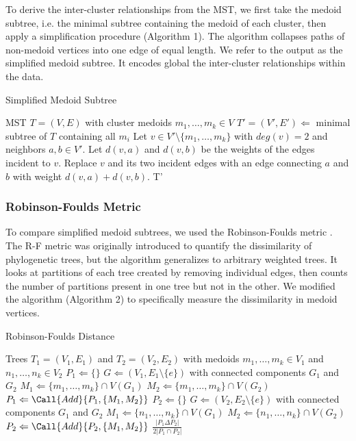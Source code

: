 \documentclass{article}
\begin{document}
{To derive the inter-cluster relationships from the MST, we first take the medoid subtree, i.e. the minimal subtree containing the medoid of each cluster, then apply a simplification procedure (Algorithm 1). The algorithm collapses paths of non-medoid vertices into one edge of equal length. We refer to the output as the simplified medoid subtree. It encodes global the inter-cluster relationships within the data.

\begin{algorithm}[t]
\caption{Simplified Medoid Subtree}\label{algo1}
\begin{algorithmic}[1]
\Require MST $T = (V, E)$ with cluster medoids $m_1, \hdots, m_k \in V$
\State $T' = (V', E') \Leftarrow$ minimal subtree of $T$ containing all $m_i$
\Repeat
	\State Let $v \in V' \setminus \{m_1,  \hdots, m_k\}$ with $deg(v) = 2$ and neighbors $a, b \in V'$. Let $d(v, a)$ and $d(v, b)$ be the weights of the edges incident to $v$.
	\State Replace $v$ and its two incident edges with an edge connecting $a$ and $b$ with weight $d(v, a) + d(v, b)$.
\State \Output T'
\end{algorithmic}
\end{algorithm}

\subsubsection{Robinson-Foulds Metric}
To compare simplified medoid subtrees, we used the Robinson-Foulds metric \cite{RF metric}. The R-F metric was originally introduced to quantify the dissimilarity of phylogenetic trees, but the algorithm generalizes to arbitrary weighted trees. It looks at partitions of each tree created by removing individual edges, then counts the number of partitions present in one tree but not in the other. We modified the algorithm (Algorithm 2) to specifically measure the dissimilarity in medoid vertices.

\begin{algorithm}[b]
\caption{Robinson-Foulds Distance}\label{algo2}
\begin{algorithmic}[2]
\Require Trees $T_1 = (V_1,E_1)$ and $T_2 = (V_2, E_2)$ with medoids $m_1, \hdots, m_k \in V_1$ and $n_1, \hdots, n_k \in V_2$
\State $P_1 \Leftarrow \{\}$
	\State $G \Leftarrow (V_1, E_1 \setminus \{e\})$ with connected components $G_1$ and $G_2$
	\State $M_1 \Leftarrow \{m_1,\hdots,m_k\} \cap V(G_1)$
	\State $M_2 \Leftarrow \{m_1,\hdots,m_k\} \cap V(G_2)$
	\State $P_1 \Leftarrow \Call{Add}{P_1, \{M_1, M_2\}}$
\EndFor
\State $P_2 \Leftarrow \{\}$
	\State $G \Leftarrow (V_2, E_2 \setminus \{e\})$ with connected components $G_1$ and $G_2$
	\State $M_1 \Leftarrow \{n_1,\hdots,n_k\} \cap V(G_1)$
	\State $M_2 \Leftarrow \{n_1,\hdots,n_k\} \cap V(G_2)$
	\State $P_2 \Leftarrow \Call{Add}{P_2, \{M_1, M_2\}}$
\EndFor
\State \Output $\frac{\left|P_1 \Delta P_2 \right|}{2\left| P_1 \cap P_2 \right|}$
\end{algorithmic}
\end{algorithm}

}
\end{document}
